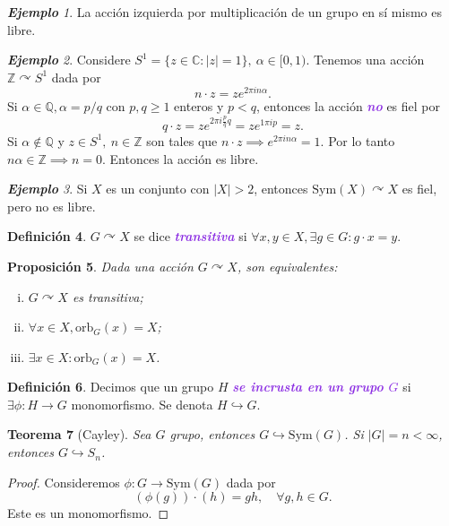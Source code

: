 \documentclass{article}
\newtheorem{theorem}{Teorema}[subsection]
\newtheorem{proposition}[theorem]{Proposición}
\theoremstyle{definition}
\newtheorem{definition}[theorem]{Definición}
\theoremstyle{remark}
\newtheorem{example}[theorem]{\textbf{Ejemplo}}
\numberwithin{equation}{section}
\newcommand{\C}{\mathbb{C}}
\newcommand{\Q}{\mathbb{Q}}
\newcommand{\Z}{\mathbb{Z}}
\newcommand{\oo}{\infty}
\newcommand{\embed}{\hookrightarrow}
\newcommand{\acts}{\curvearrowright}
\renewcommand{\c}{\cdot}
\newcommand{\orb}{\mathrm{orb}}
\newcommand{\Sym}{\mathrm{Sym}}
\newcommand{\abs}[1]{\left| #1 \right|}
\newcommand{\wea}[1]{\textcolor{BlueViolet}{\textbf{\emph{#1}}}}
\begin{document}
\begin{example}
  La acción izquierda por multiplicación de un grupo en sí mismo es libre.
\end{example}

\begin{example}
  Considere $S^1 = \{z \in \C : \abs z = 1\}, \ \alpha \in [0,1)$. Tenemos una acción $\Z \acts S^1$ dada por $$n \c z = z e^{2\pi in\alpha}.$$
  Si $\alpha \in \Q, \alpha = p/q$ con $p,q \geq 1$ enteros y $p < q$, entonces la acción \wea{no} es fiel por
  \[q \c z = ze^{2\pi i \frac{p}{q} q} = ze^{1\pi i p} = z.\]
  Si $\alpha \notin \Q$ y $z \in S^1, \ n \in \Z$ son tales que $n \c z \implies e^{2\pi i n \alpha} = 1$. Por lo tanto $n\alpha \in \Z \implies n=0$. Entonces la acción es libre.
\end{example}

\begin{example}
  Si $X$ es un conjunto con $\abs X > 2$, entonces $\Sym(X) \acts X$ es fiel, pero no es libre.
\end{example}

\begin{definition}
  $G \acts X$ se dice \wea{transitiva} si $\forall x,y \in X, \exists g \in G : g\c x = y$.
\end{definition}

\begin{proposition}
  Dada una acción $G \acts X$, son equivalentes:
  \begin{enumerate}[(i)]
    \item $G \acts X$ es transitiva;
    \item $\forall x \in X, \orb_G(x) = X$;
    \item $\exists x \in X : \orb_G(x) = X$.
  \end{enumerate}
\end{proposition}

\begin{definition}
  Decimos que un grupo $H$ \wea{se incrusta en un grupo $G$} si $\exists \phi \colon H \to G$ monomorfismo. Se denota $H \embed G$.
\end{definition}

\begin{theorem}
  [Cayley]
  Sea $G$ grupo, entonces $G \embed \Sym(G)$. Si $\abs G = n < \oo$, entonces $G \embed S_n$.
\end{theorem}
\begin{proof}
  Consideremos $\phi \colon G \to \Sym(G)$ dada por $$(\phi(g))\c(h) = gh, \quad \forall g,h \in G.$$
  Este es un monomorfismo.
\end{proof}
\end{document}
